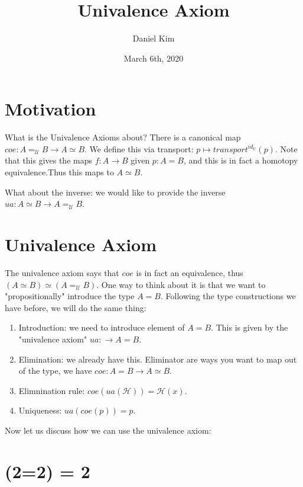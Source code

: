 \documentclass[../main.tex]{subfiles}
\title{Univalence Axiom}
\author{Daniel Kim}
\date{March 6th, 2020}
\begin{document}
\maketitle

\tableofcontents

\section{Motivation}

What is the Univalence Axioms about? There is a canonical map $coe: A =_{\mathcal{U}} B \rightarrow A \simeq B$. We define this via transport: $p \mapsto transport^{id_U}(p)$. Note that this gives the maps $f : A \rightarrow B$ given $p: A = B$, and this is in fact a homotopy equivalence.Thus this maps to $A \simeq B$. 

What about the inverse: we would like to provide the inverse $ua: A \simeq B \rightarrow A =_{\mathcal{U}} B$.

\section{Univalence Axiom}

The univalence axiom says that $coe$ is in fact an equivalence, thus $(A \simeq B) \simeq (A =_{\mathcal{U}} B)$. One way to think about it is that we want to "propositionally" introduce the type $A = B$. Following the type constructions we have before, we will do the same thing:

\begin{enumerate}
    \item Introduction: we need to introduce element of $A = B$. This is given by the "univalence axiom" $ua: \rightarrow A = B$.
    \item Elimination: we already have this. Eliminator are ways you want to map out of the type, we have $coe: A = B \rightarrow A \simeq B$.
    \item Elimnination rule: $coe(ua(\mathcal{H})) = \mathcal{H}(x)$.
    \item Uniqueness: $ua(coe(p)) = p$.
    
\end{enumerate}

Now let us discuss how we can use the univalence axiom:

\section{(2=2) = 2}
\end{document}
